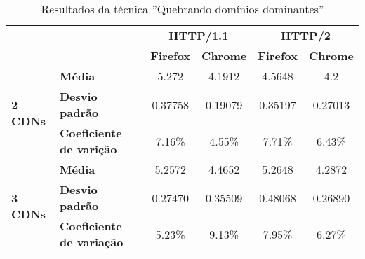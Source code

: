 \begin{table}[H]
\centering
\caption{Resultados da técnica ''Quebrando domínios dominantes''}
\label{resultados-quebrandodominiosdominantes}
\begin{tabular}{ll|c|c|c|c|}
\cline{3-6}
                                                       & \multicolumn{1}{c|}{\textbf{}}   & \multicolumn{2}{c|}{\textbf{HTTP/1.1}} & \multicolumn{2}{c|}{\textbf{HTTP/2}} \\ \cline{3-6} 
\multicolumn{1}{c}{}                                   &                                  & \textbf{Firefox}   & \textbf{Chrome}   & \textbf{Firefox}  & \textbf{Chrome}  \\ \hline
\multicolumn{1}{|l|}{\multirow{3}{*}{\textbf{2 CDNs}}} & \textbf{Média}                   & 5.272              & 4.1912            & 4.5648            & 4.2              \\ \cline{2-6} 
\multicolumn{1}{|l|}{}                                 & \textbf{Desvio padrão}           & 0.37758            & 0.19079           & 0.35197           & 0.27013          \\ \cline{2-6} 
\multicolumn{1}{|l|}{}                                 & \textbf{Coeficiente de varição}  & 7.16\%             & 4.55\%            & 7.71\%            & 6.43\%           \\ \hline
\multicolumn{1}{|l|}{\multirow{3}{*}{\textbf{3 CDNs}}} & \textbf{Média}                   & 5.2572             & 4.4652            & 5.2648            & 4.2872           \\ \cline{2-6} 
\multicolumn{1}{|l|}{}                                 & \textbf{Desvio padrão}           & 0.27470            & 0.35509           & 0.48068           & 0.26890          \\ \cline{2-6} 
\multicolumn{1}{|l|}{}                                 & \textbf{Coeficiente de variação} & 5.23\%             & 9.13\%            & 7.95\%            & 6.27\%           \\ \hline
\end{tabular}
\end{table}